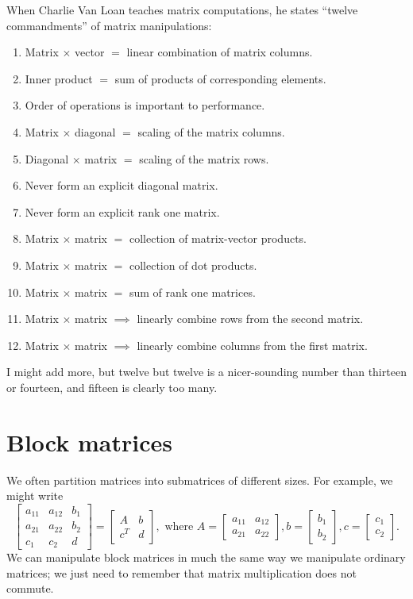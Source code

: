 \documentclass[12pt, leqno]{article}
\begin{document}
When Charlie Van Loan teaches matrix computations, he states
``twelve commandments'' of matrix manipulations:
\begin{enumerate}
\item Matrix $\times$ vector $=$ linear combination of matrix columns.
\item Inner product $=$ sum of products of corresponding elements.
\item Order of operations is important to performance.
\item Matrix $\times$ diagonal $=$ scaling of the matrix columns.
\item Diagonal $\times$ matrix $=$ scaling of the matrix rows.
\item Never form an explicit diagonal matrix.
\item Never form an explicit rank one matrix.
\item Matrix $\times$ matrix $=$ collection of matrix-vector products.
\item Matrix $\times$ matrix $=$ collection of dot products.
\item Matrix $\times$ matrix $=$ sum of rank one matrices.
\item Matrix $\times$ matrix $\implies$ linearly combine rows from
  the second matrix.
\item Matrix $\times$ matrix $\implies$ linearly combine columns from
  the first matrix.
\end{enumerate}
I might add more, but twelve but twelve is a nicer-sounding
number than thirteen or fourteen, and fifteen is clearly too many.

\section*{Block matrices}

We often partition matrices into submatrices of different
sizes.  For example, we might write
\[
  \begin{bmatrix}
    a_{11} & a_{12} & b_1 \\
    a_{21} & a_{22} & b_2 \\
    c_1 & c_2 & d
  \end{bmatrix} =
  \begin{bmatrix}
    A & b \\
    c^T & d
  \end{bmatrix}, \mbox{ where }
  A = \begin{bmatrix} a_{11} & a_{12} \\ a_{21} & a_{22} \end{bmatrix},
  b = \begin{bmatrix} b_1 \\ b_2 \end{bmatrix},
  c = \begin{bmatrix} c_1 \\ c_2 \end{bmatrix}.
\]
We can manipulate block matrices in much the same way we manipulate
ordinary matrices; we just need to remember that matrix multiplication
does not commute.
\end{document}
